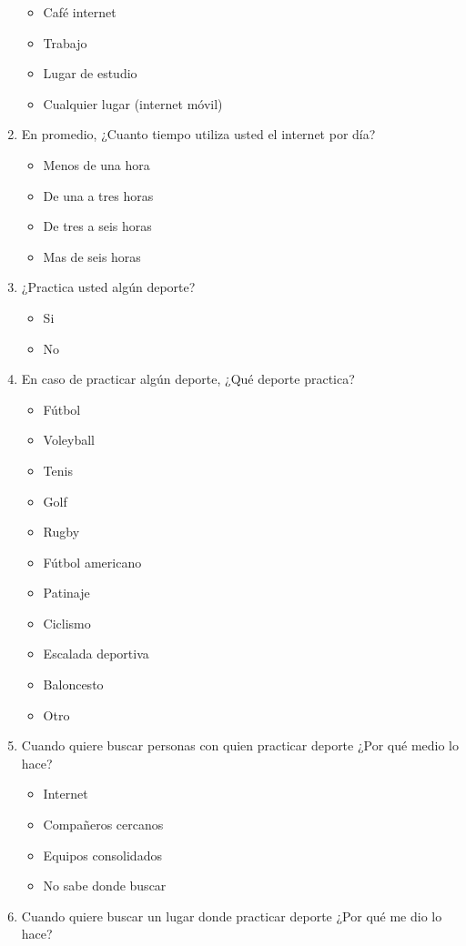 \begin{enumerate}
\begin{itemize}
    \item Café internet
    \item Trabajo
    \item Lugar de estudio
    \item Cualquier lugar (internet móvil)
  \end{itemize}
  \item En promedio, ¿Cuanto tiempo utiliza usted el internet por día?
  \begin{itemize}
    \item Menos de una hora
    \item De una a tres horas
    \item De tres a seis horas
    \item Mas de seis horas
  \end{itemize}
  \item ¿Practica usted algún deporte?
  \begin{itemize}
    \item Si
    \item No
  \end{itemize}
  \item En caso de practicar algún deporte, ¿Qué deporte practica?
  \begin{itemize}
    \item Fútbol
    \item Voleyball
    \item Tenis
    \item Golf
    \item Rugby
    \item Fútbol americano
    \item Patinaje
    \item Ciclismo
    \item Escalada deportiva
    \item Baloncesto
    \item Otro
  \end{itemize}
  \item Cuando quiere buscar personas con quien practicar deporte ¿Por qué medio lo hace?
  \begin{itemize}
    \item Internet
    \item Compañeros cercanos
    \item Equipos consolidados
    \item No sabe donde buscar
  \end{itemize}
  \item Cuando quiere buscar un lugar donde practicar deporte ¿Por qué me dio lo hace?

\end{enumerate}
